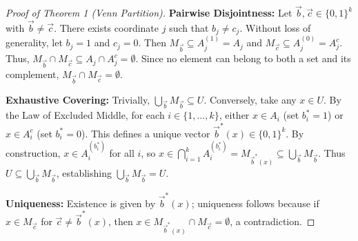 \documentclass[11pt,a4paper]{article}
\begin{document}
\begin{proof}[Proof of Theorem 1 (Venn Partition)]
\textbf{Pairwise Disjointness:} Let $\vec{b}, \vec{c} \in \{0, 1\}^k$ with $\vec{b} \neq \vec{c}$. There exists coordinate $j$ such that $b_j \neq c_j$. Without loss of generality, let $b_j = 1$ and $c_j = 0$. Then $M_{\vec{b}} \subseteq A_j^{(1)} = A_j$ and $M_{\vec{c}} \subseteq A_j^{(0)} = A_j^c$.
Thus, $M_{\vec{b}} \cap M_{\vec{c}} \subseteq A_j \cap A_j^c = \emptyset$. Since no element can belong to both a set and its complement, $M_{\vec{b}} \cap M_{\vec{c}} = \emptyset$.

\textbf{Exhaustive Covering:} Trivially, $\bigcup_{\vec{b}} M_{\vec{b}} \subseteq U$. Conversely, take any $x \in U$. By the Law of Excluded Middle, for each $i \in \{1, \dots, k\}$, either $x \in A_i$ (set $b_i^* = 1$) or $x \in A_i^c$ (set $b_i^* = 0$). This defines a unique vector $\vec{b}^*(x) \in \{0, 1\}^k$. By construction, $x \in A_i^{(b_i^*)}$ for all $i$, so $x \in \bigcap_{i=1}^k A_i^{(b_i^*)} = M_{\vec{b}^*(x)} \subseteq \bigcup_{\vec{b}} M_{\vec{b}}$. Thus $U \subseteq \bigcup_{\vec{b}} M_{\vec{b}}$, establishing $\bigcup_{\vec{b}} M_{\vec{b}} = U$.

\textbf{Uniqueness:} Existence is given by $\vec{b}^*(x)$; uniqueness follows because if $x \in M_{\vec{c}}$ for $\vec{c} \neq \vec{b}^*(x)$, then $x \in M_{\vec{b}^*(x)} \cap M_{\vec{c}} = \emptyset$, a contradiction.
\end{proof}
\end{document}
